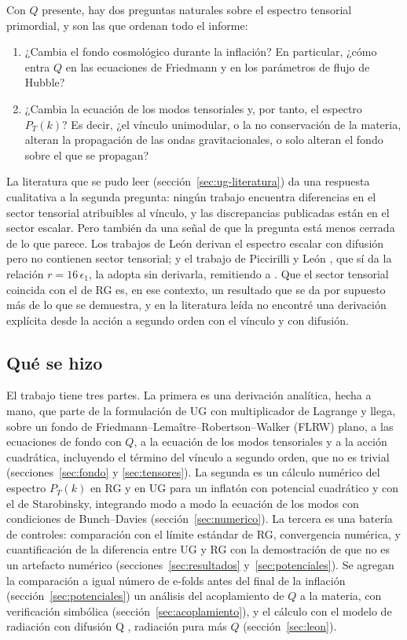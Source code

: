 Con $Q$ presente, hay dos preguntas naturales sobre el espectro tensorial primordial, y son las que ordenan todo el informe:
\begin{enumerate}[label=(\alph*),nosep]
\item ¿Cambia el fondo cosmológico durante la inflación? En particular, ¿cómo entra $Q$ en las ecuaciones de Friedmann y en los parámetros de flujo de Hubble?
\item ¿Cambia la ecuación de los modos tensoriales y, por tanto, el espectro $P_T(k)$? Es decir, ¿el vínculo unimodular, o la no conservación de la materia, alteran la propagación de las ondas gravitacionales, o solo alteran el fondo sobre el que se propagan?
\end{enumerate}
La literatura que se pudo leer (sección~\ref{sec:ug-literatura}) da una respuesta cualitativa a la segunda pregunta: ningún trabajo encuentra diferencias en el sector tensorial atribuibles al vínculo, y las discrepancias publicadas están en el sector escalar. Pero también da una señal de que la pregunta está menos cerrada de lo que parece. Los trabajos de León \cite{leon22} derivan el espectro escalar con difusión pero no contienen sector tensorial; y el trabajo de Piccirilli y León \cite{piccirilli23}, que sí da la relación $r=16\,\epsilon_1$, la adopta sin derivarla, remitiendo a \cite{leon22}. Que el sector tensorial coincida con el de RG es, en ese contexto, un resultado que se da por supuesto más de lo que se demuestra, y en la literatura leída no encontré una derivación explícita desde la acción a segundo orden con el vínculo y con difusión.

\subsection*{Qué se hizo}

El trabajo tiene tres partes. La primera es una derivación analítica, hecha a mano, que parte de la formulación de UG con multiplicador de Lagrange y llega, sobre un fondo de Friedmann–Lemaître–Robertson–Walker (FLRW) plano, a las ecuaciones de fondo con $Q$, a la ecuación de los modos tensoriales y a la acción cuadrática, incluyendo el término del vínculo a segundo orden, que no es trivial (secciones~\ref{sec:fondo} y \ref{sec:tensores}). La segunda es un cálculo numérico del espectro $P_T(k)$ en RG y en UG para un inflatón con potencial cuadrático y con el de Starobinsky, integrando modo a modo la ecuación de los modos con condiciones de Bunch–Davies (sección~\ref{sec:numerico}). La tercera es una batería de controles: comparación con el límite estándar de RG, convergencia numérica, y cuantificación de la diferencia entre UG y RG con la demostración de que no es un artefacto numérico (secciones~\ref{sec:resultados} y~\ref{sec:potenciales}). Se agregan la comparación a igual número de e-folds antes del final de la inflación (sección~\ref{sec:potenciales}) un análisis del acoplamiento de $Q$ a la materia, con verificación simbólica (sección~\ref{sec:acoplamiento}), y el cálculo con el modelo de radiación con difusión Q \cite{leon22,piccirilli23}, radiación pura más $Q$ (sección~\ref{sec:leon}).

